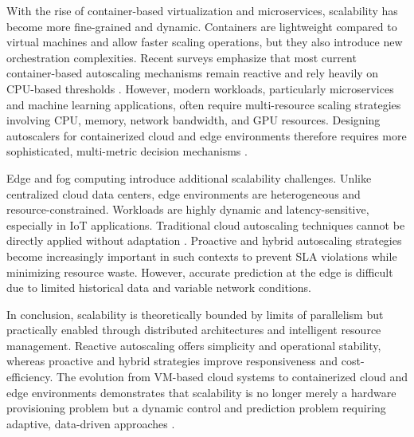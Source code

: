 With the rise of container-based virtualization and microservices, scalability has become more fine-grained and dynamic. Containers are lightweight compared to virtual machines and allow faster scaling operations, but they also introduce new orchestration complexities. Recent surveys emphasize that most current container-based autoscaling mechanisms remain reactive and rely heavily on CPU-based thresholds \cite{dogani2023}. However, modern workloads, particularly microservices and machine learning applications, often require multi-resource scaling strategies involving CPU, memory, network bandwidth, and GPU resources. Designing autoscalers for containerized cloud and edge environments therefore requires more sophisticated, multi-metric decision mechanisms \cite{dogani2023}.

Edge and fog computing introduce additional scalability challenges. Unlike centralized cloud data centers, edge environments are heterogeneous and resource-constrained. Workloads are highly dynamic and latency-sensitive, especially in IoT applications. Traditional cloud autoscaling techniques cannot be directly applied without adaptation \cite{dogani2023}. Proactive and hybrid autoscaling strategies become increasingly important in such contexts to prevent SLA violations while minimizing resource waste. However, accurate prediction at the edge is difficult due to limited historical data and variable network conditions.

In conclusion, scalability is theoretically bounded by limits of parallelism but practically enabled through distributed architectures and intelligent resource management. Reactive autoscaling offers simplicity and operational stability, whereas proactive and hybrid strategies improve responsiveness and cost-efficiency. The evolution from VM-based cloud systems to containerized cloud and edge environments demonstrates that scalability is no longer merely a hardware provisioning problem but a dynamic control and prediction problem requiring adaptive, data-driven approaches \cite{lorido2014,dogani2023}.
